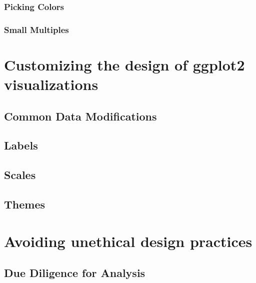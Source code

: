 \documentclass[
]{krantz}
\begin{document}
\hypertarget{picking-colors}{%
\subsection{Picking Colors}\label{picking-colors}}

\hypertarget{small-multiples}{%
\subsection{Small Multiples}\label{small-multiples}}

\hypertarget{customizing-visualization-design}{%
\chapter{Customizing the design of ggplot2 visualizations}\label{customizing-visualization-design}}

\hypertarget{common-data-modifications}{%
\section{Common Data Modifications}\label{common-data-modifications}}

\hypertarget{labels}{%
\section{Labels}\label{labels}}

\hypertarget{scales}{%
\section{Scales}\label{scales}}

\hypertarget{themes}{%
\section{Themes}\label{themes}}

\hypertarget{ethical-design-practices}{%
\chapter{Avoiding unethical design practices}\label{ethical-design-practices}}

\hypertarget{due-diligence-for-analysis}{%
\section{Due Diligence for Analysis}\label{due-diligence-for-analysis}}
\end{document}
